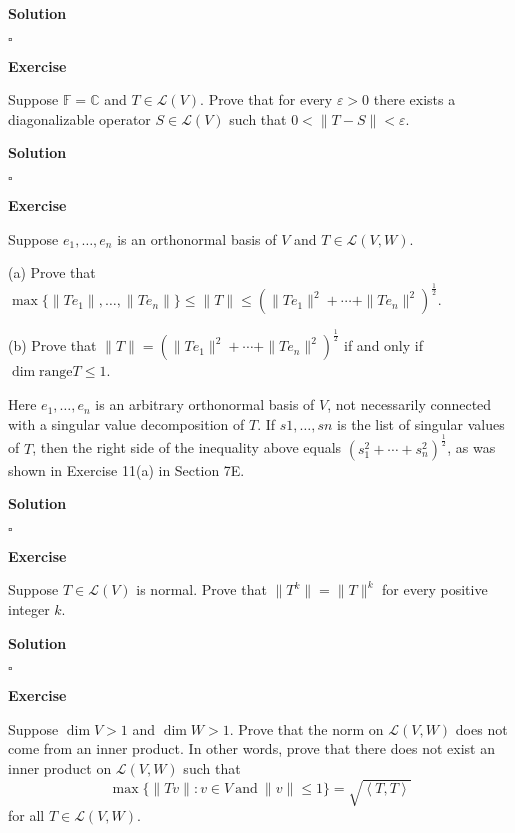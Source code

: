 \documentclass{article}
\newenvironment{exercise}{%
{\textbf{Exercise\\}
    }
}{
}
\newenvironment{solution}{%
{
    \textbf{Solution\\}
    }
}{
  \hfill $\square$ 
  \par\bigskip 
}
\newcommand{\CC}{\mathbb{C}}
\newcommand{\FF}{\mathbb{F}}
\newcommand{\range}{\text{range}}
\begin{document}
\begin{CJK}{UTF8}{gkai}
\begin{solution}

\end{solution}

\begin{exercise}
    Suppose $\FF = \CC$ and $T \in \mathcal{L}(V)$. Prove that for every $\varepsilon > 0$ there exists a diagonalizable operator $S \in \mathcal{L}(V)$ such that $0 < \|T - S\| < \varepsilon$.
\end{exercise}

\begin{solution}

\end{solution}

\begin{exercise}
    Suppose $e_1,\ldots,e_n$ is an orthonormal basis of $V$ and $T \in \mathcal{L}(V,W)$.

    (a) Prove that $\max\{\|Te_1\|,\ldots,\|Te_n\|\} \leq \|T\| \leq (\|Te_1\|^2 + \cdots + \|Te_n\|^2)^{\frac{1}{2}}$.

    (b) Prove that $\|T\| = (\|Te_1\|^2 + \cdots + \|Te_n\|^2)^{\frac{1}{2}}$ if and only if $\dim\range T \leq 1$.

    Here $e_1,\ldots,e_n$ is an arbitrary orthonormal basis of $V$, not necessarily connected with a singular value decomposition of $T$. If $s1,\ldots,sn$ is the list of singular values of $T$, then the right side of the inequality above equals $(s_1^2 + \cdots +s_n^2)^{\frac{1}{2}}$, as was shown in Exercise 11(a) in Section 7E.
\end{exercise}

\begin{solution}

\end{solution}

\begin{exercise}
    Suppose $T \in \mathcal{L}(V)$ is normal. Prove that $\|T^k\| = \|T\|^k$ for every positive integer $k$.
\end{exercise}

\begin{solution}
    
\end{solution}

\begin{exercise}
    Suppose $\dim V > 1$ and $\dim W > 1$. Prove that the norm on $\mathcal{L}(V,W)$ does not come from an inner product. In other words, prove that there does not exist an inner product on $\mathcal{L}(V,W)$ such that
    \[\max\{\|Tv\| : v \in V ~\text{and}~ \|v\| \leq 1\} = \sqrt{\left<T,T\right>}\]
    for all $T \in \mathcal{L}(V,W)$.
\end{exercise}


\end{CJK}
\end{document}
